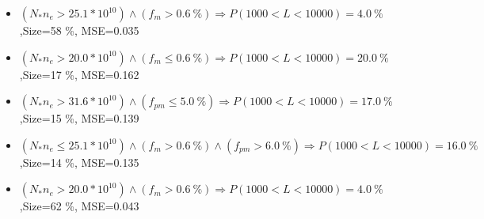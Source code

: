 \documentclass[numbered]{CSL}
\begin{document}
\begin{itemize}
\item $(N_* n_e > 25.1 * 10^{10}) \land (f_m > 0.6~\%) \Rightarrow P(1 000 < L < 10 000) = 4.0~\%$,\hfill Size=58 \%, MSE=0.035
\item $(N_* n_e > 20.0 * 10^{10}) \land (f_m \leq 0.6~\%) \Rightarrow P(1 000 < L < 10 000) = 20.0~\%$,\hfill Size=17 \%, MSE=0.162
\item $(N_* n_e > 31.6 * 10^{10}) \land (f_{pm} \leq 5.0~\%) \Rightarrow P(1 000 < L < 10 000) = 17.0~\%$,\hfill Size=15 \%, MSE=0.139
\item $(N_* n_e \leq 25.1 * 10^{10}) \land (f_m > 0.6~\%) \land (f_{pm} > 6.0~\%) \Rightarrow P(1 000 < L < 10 000) = 16.0~\%$,\hfill Size=14 \%, MSE=0.135
\item $(N_* n_e > 20.0 * 10^{10}) \land (f_m > 0.6~\%) \Rightarrow P(1 000 < L < 10 000) = 4.0~\%$,\hfill Size=62 \%, MSE=0.043
\end{itemize}
\end{document}
